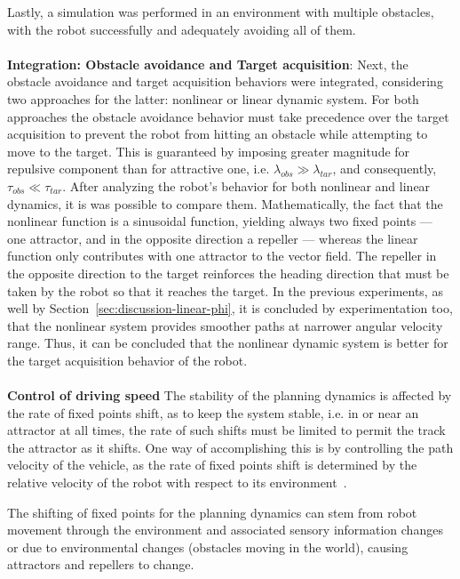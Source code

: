 Lastly, a simulation was performed
in an environment with multiple obstacles, with the robot successfully and
adequately avoiding all of them.
\\\\
\textbf{Integration: Obstacle avoidance and Target acquisition}:
Next, the obstacle avoidance and target acquisition behaviors were integrated,
considering two approaches for the latter: nonlinear or linear dynamic
system. For both approaches the obstacle avoidance behavior must take precedence over the target acquisition
to prevent the robot from hitting an obstacle while attempting to move to the
target. This is guaranteed by imposing greater magnitude for repulsive component than for
attractive one, i.e. $\lambda_{obs} \gg \lambda_{tar}$, and consequently,
$\tau_{obs} \ll \tau_{tar}$.
After analyzing the robot's behavior for both nonlinear and linear dynamics, it
is was possible to compare them.
Mathematically, the fact that the nonlinear function is a sinusoidal function, yielding always
two fixed points --- one attractor, and in the opposite direction a
repeller --- whereas the linear function only contributes with one attractor to
the vector field. 
The repeller in the opposite direction to the target reinforces the heading direction that must be taken by the robot so that it reaches the target.
In the previous experiments, as well by Section~\ref{sec:discussion-linear-phi},
it is concluded by experimentation too, that the nonlinear system provides smoother paths at narrower angular velocity range.
Thus, it can be concluded that the nonlinear dynamic system is better for the target acquisition behavior of the robot. 
%
\\\\
\textbf{Control of driving speed}
The stability of the planning dynamics is affected by the rate of fixed points
shift, as to keep the system stable, i.e. in or near an attractor at all times, the rate of such
shifts must be limited to permit the track the attractor as it shifts. One way
of accomplishing this is by controlling the path velocity of the vehicle, as the
rate of fixed points shift is determined by the relative velocity of the robot
with respect to its environment~\cite{bicho2000dynamic}.

The shifting of fixed points for the planning dynamics can stem from robot
movement through the environment and associated sensory information 
changes or due to environmental changes (obstacles moving in the world), causing
attractors and repellers to change. 

